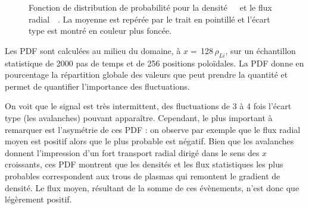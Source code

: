 \begin{refsection}
\begin{figure}[!htbp]
    \centering
    \caption{Fonction de distribution de probabilité pour la
    densité~~~et le flux
    radial~~. La moyenne est repérée par le trait en
    pointillé et l'écart type est montré en couleur plus foncée.}
    \label{2-PDFBase}
\end{figure}

Les PDF
sont calculées au milieu du domaine, à $x=\,$128$\,\rho_{Li}$, sur un
échantillon statistique de 2000 pas de temps et de 256 positions
poloïdales. La PDF donne en pourcentage la répartition globale des valeurs
que peut prendre la quantité et permet de quantifier l'importance des fluctuations.

On voit que le signal est très
intermittent, des fluctuations de 3 à 4 fois l'écart type (les avalanches)
pouvant apparaître. Cependant, le plus important à remarquer est l'asymétrie de
ces PDF :
on observe par exemple que le flux radial moyen est positif alors que le plus
probable est négatif. Bien que
les avalanches donnent l'impression d'un fort transport radial dirigé
dans le sens des $x$ croissants, ces PDF montrent que les densités et les flux
statistiques les plus probables correspondent aux trous de plasmas qui
remontent le gradient de densité. Le flux moyen, résultant de la somme de
ces évènements, n'est donc que légèrement positif.


\end{refsection}

